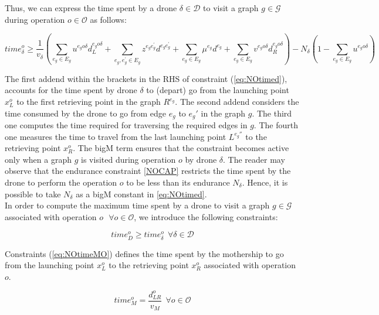 \noindent
Thus, we can express the time spent by a drone $\delta \in \mathcal D$ to visit a graph $g \in \mathcal G$ during operation $o \in \mathcal O$ as follows:

\begin{equation}
time_\delta^o \geq \frac{1}{v_\delta}\left(\sum_{e_g\in E_g} u^{e_go\delta}d_L^{e_go\delta} + \sum_{e_g, e^\prime_g\in E_g}z^{e_ge^\prime_g}d^{e_ge^\prime_g} + \sum_{e_g\in E_g} \mu^{e_g}d^{e_g} + \sum_{e_g\in E_g} v^{e_go\delta}d_R^{e_go\delta}\right) - N_\delta(1 - \sum_{e_g\in E_g} u^{e_go\delta})
\label{eq:NOtimed}
\end{equation}

\noindent
The first addend within the brackets in the RHS of constraint (\ref{eq:NOtimed}), accounts for the time spent by drone $\delta$ to (depart) go from the launching point $x_L^o$ to the first retrieving point in the graph $R^{e_g}$. The second addend considers the time consumed by the drone to go from edge $e_g$ to $e_g'$ in the graph $g$. The third one computes the time required for traversing the required edges in $g$. The fourth one measures the time to travel from the last launching point $L^{e_g''}$ to the retrieving point $x_R^o$.
The bigM term ensures that the constraint becomes active only when a graph $g$ is visited during operation $o$ by drone $\delta$. The reader may observe that the endurance constraint \eqref{NOCAP} restricts the time spent by the drone to perform the operation $o$ to be less than its endurance $N_\delta$. Hence, it is possible to take $N_\delta$ as a bigM constant in \eqref{eq:NOtimed}.\\


\noindent
In order to compute the maximum time spent by a drone to visit a graph $g \in \mathcal G$ associated with operation $o \:\:\ \forall o \in \mathcal O$, we introduce the following constraints:

\begin{equation}
time_D^o \geq time_\delta^o \:\: \forall \delta \in \mathcal D%
\label{eq:NOtimeD}
\end{equation}

\noindent
Constraints (\ref{eq:NOtimeMO}) defines the time spent by the mothership to go from the launching point $x_L^o$ to the retrieving point $x_R^o$ associated with operation $o$. 

\begin{equation}
time_M^o = \frac{d_{LR}^o}{v_M} \:\: \forall o \in \mathcal O
\label{eq:NOtimeMO}
\end{equation}

